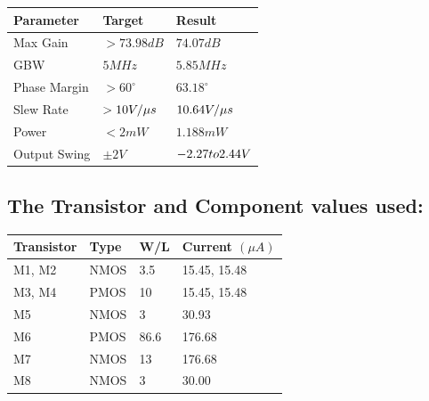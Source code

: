 \documentclass[
]{article}
\newcounter{none} %
\begin{document}
{\def\LTcaptype{none} %
\begin{longtable}[]{@{}
  >{\raggedright\arraybackslash}p{}
  >{\raggedright\arraybackslash}p{}
  >{\raggedright\arraybackslash}p{}@{}}
\toprule\noalign{}
\begin{minipage}[b]{\linewidth}\raggedright
Parameter
\end{minipage} & \begin{minipage}[b]{\linewidth}\raggedright
Target
\end{minipage} & \begin{minipage}[b]{\linewidth}\raggedright
Result
\end{minipage} \\
\midrule\noalign{}
\endhead
\bottomrule\noalign{}
\endlastfoot
Max Gain & \(> 73.98 dB\) & \(74.07 dB\) \\
GBW & \(5 MHz\) & \(5.85 MHz\) \\
Phase Margin & \(>60^{\circ}\) & \(63.18^{\circ}\) \\
Slew Rate & \(> 10 \space V/\mu s\) & \(10.64 \space V/\mu s\) \\
Power & \(< 2mW\) & \(1.188mW\) \\
Output Swing & \(\pm 2V\) & \(-2.27 \space to \space 2.44 V\) \\
\end{longtable}
}

\subsection{The Transistor and Component values
used:}\label{the-transistor-and-component-values-used}

{\def\LTcaptype{none} %
\begin{longtable}[]{@{}llll@{}}
\toprule\noalign{}
Transistor & Type & W/L & Current \(({\mu}A)\) \\
\midrule\noalign{}
\endhead
\bottomrule\noalign{}
\endlastfoot
M1, M2 & NMOS & 3.5 & 15.45, 15.48 \\
M3, M4 & PMOS & 10 & 15.45, 15.48 \\
M5 & NMOS & 3 & 30.93 \\
M6 & PMOS & 86.6 & 176.68 \\
M7 & NMOS & 13 & 176.68 \\
M8 & NMOS & 3 & 30.00 \\
\end{longtable}
}
\end{document}

